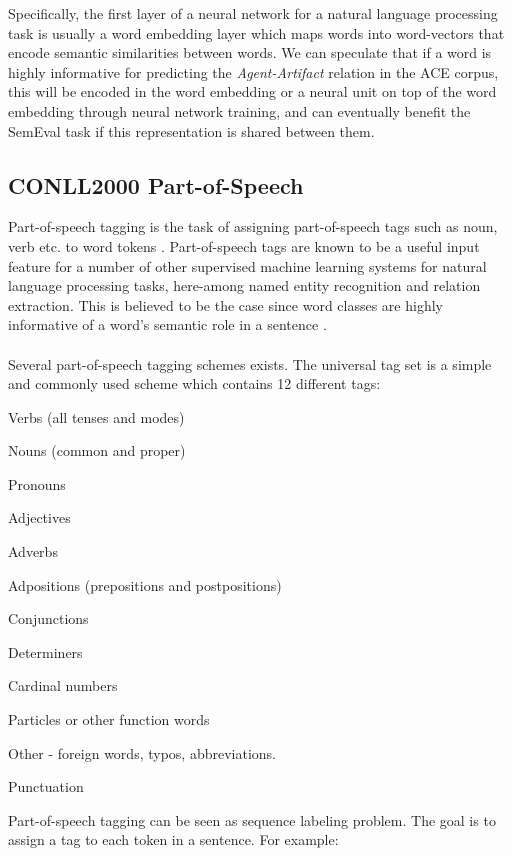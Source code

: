 Specifically, the first layer of a neural network for a natural language processing task is usually a word embedding layer which maps words into word-vectors that encode semantic similarities between words. We can speculate that if a word is highly informative for predicting the \textit{Agent-Artifact} relation in the ACE corpus, this will be encoded in the word embedding or a neural unit on top of the word embedding through neural network training, and can eventually benefit the SemEval task if this representation is shared between them.

\subsection{CONLL2000 Part-of-Speech}
Part-of-speech tagging is the task of assigning part-of-speech tags such as noun, verb etc. to word tokens \citep{jurafsky09}. Part-of-speech tags are known to be a useful input feature for a number of other supervised machine learning systems for natural language processing tasks, here-among named entity recognition and relation extraction. This is believed to be the case since word classes are highly informative of a word's semantic role in a sentence \citep{jurafsky09}.
\\\\
Several part-of-speech tagging schemes exists. The universal tag set is a simple and commonly used scheme which contains 12 different tags:
\begin{description}[labelindent=4em,leftmargin=4em]
	\item [VERB] Verbs (all tenses and modes)
	\item [NOUN] Nouns (common and proper)
	\item [PRON] Pronouns
	\item [ADJ] Adjectives
	\item [ADV] Adverbs
	\item [ADP] Adpositions (prepositions and postpositions)
	\item [CONJ] Conjunctions
	\item [DET] Determiners
	\item [NUM] Cardinal numbers
	\item [PRT] Particles or other function words
	\item [X] Other - foreign words, typos, abbreviations.
	\item [.] Punctuation
\end{description}
\noindent
Part-of-speech tagging can be seen as sequence labeling problem. The goal is to assign a tag to each token in a sentence. For example:
